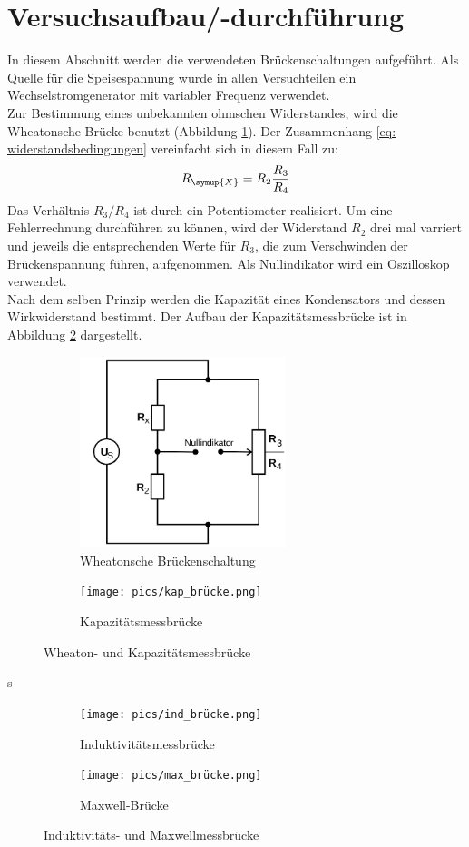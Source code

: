 \section{Versuchsaufbau/-durchführung}\label{abs: aufbau}
In diesem Abschnitt werden die verwendeten Brückenschaltungen aufgeführt. Als Quelle für
die Speisespannung wurde in allen Versuchteilen ein Wechselstromgenerator mit variabler Frequenz
verwendet. \\
Zur Bestimmung eines unbekannten ohmschen Widerstandes, wird die Wheatonsche Brücke
benutzt (Abbildung \ref{fig: wheaton}).
Der Zusammenhang \eqref{eq: widerstandsbedingungen} vereinfacht sich in diesem Fall zu:
\begin{equation}
  R_{\symup{X}} = R_2 \frac{R_3}{R_4}
\end{equation}
Das Verhältnis $R_3 / R_4$ ist durch ein Potentiometer realisiert. Um eine Fehlerrechnung durchführen
zu können, wird der Widerstand $R_2$ drei mal varriert und jeweils die entsprechenden Werte für $R_3$, die
zum Verschwinden der Brückenspannung führen, aufgenommen. Als Nullindikator wird ein Oszilloskop verwendet. \\
Nach dem selben Prinzip werden die Kapazität eines Kondensators und dessen Wirkwiderstand bestimmt. Der Aufbau
der Kapazitätsmessbrücke ist in Abbildung \ref{fig: kapazität} dargestellt.

\begin{figure}
\centering
\begin{subfigure}{0.49\textwidth}
  \centering
  \includegraphics[width = 6cm]{pics/wheaton.png}
  \caption{Wheatonsche Brückenschaltung}
  \label{fig: wheaton}
\end{subfigure}
\begin{subfigure}{0.48\textwidth}
\centering
\texttt{[image: pics/kap\_brücke.png]}
\caption{Kapazitätsmessbrücke}
\label{fig: kapazität}
\end{subfigure}
\caption{Wheaton- und Kapazitätsmessbrücke \cite{anleitung302}}
\label{fig: kapind}
\end{figure}
s
\begin{figure}
\centering
\begin{subfigure}{0.49\textwidth}
\centering
  \texttt{[image: pics/ind\_brücke.png]}
\caption{Induktivitätsmessbrücke}
\label{fig: induktivität}
\end{subfigure}
\begin{subfigure}{0.49\textwidth}
  \centering
  \texttt{[image: pics/max\_brücke.png]}
  \caption{Maxwell-Brücke}
  \label{fig: maxwell}
\end{subfigure}
\caption{Induktivitäts- und Maxwellmessbrücke\cite{anleitung302}}
\label{fig: indmax}
\end{figure}

